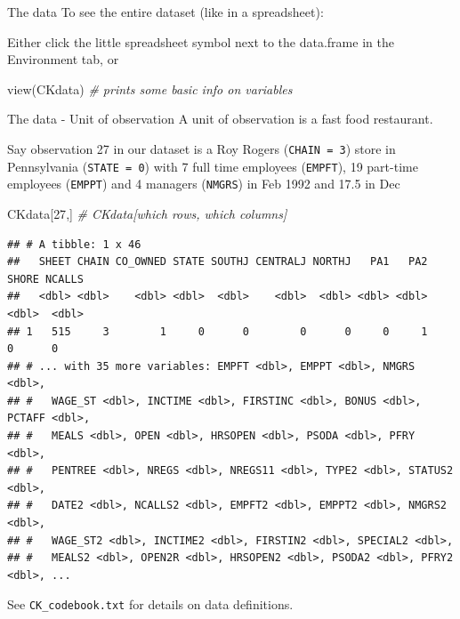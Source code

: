 \documentclass[
  ignorenonframetext,
]{beamer}
\newenvironment{Shaded}{\begin{snugshade}}{\end{snugshade}}
\newcommand{\CommentTok}[1]{\textcolor[rgb]{0.56,0.35,0.01}{\textit{#1}}}
\newcommand{\DecValTok}[1]{\textcolor[rgb]{0.00,0.00,0.81}{#1}}
\newcommand{\FunctionTok}[1]{\textcolor[rgb]{0.00,0.00,0.00}{#1}}
\newcommand{\NormalTok}[1]{#1}
\begin{document}
\begin{frame}[fragile]{The data}
\protect\hypertarget{the-data-1}{}
To see the entire dataset (like in a spreadsheet):

Either click the little spreadsheet symbol next to the data.frame in the
Environment tab, or

\begin{Shaded}
\begin{Highlighting}[]
\FunctionTok{view}\NormalTok{(CKdata)  }\CommentTok{\# prints some basic info on variables}
\end{Highlighting}
\end{Shaded}
\end{frame}

\begin{frame}[fragile]{The data - Unit of observation}
\protect\hypertarget{the-data---unit-of-observation}{}
A unit of observation is a fast food restaurant.

Say observation 27 in our dataset is a Roy Rogers (\texttt{CHAIN = 3})
store in Pennsylvania (\texttt{STATE = 0}) with 7 full time employees
(\texttt{EMPFT}), 19 part-time employees (\texttt{EMPPT}) and 4 managers
(\texttt{NMGRS}) in Feb 1992 and 17.5 in Dec

\begin{Shaded}
\begin{Highlighting}[]
\NormalTok{CKdata[}\DecValTok{27}\NormalTok{,]  }\CommentTok{\# CKdata[which rows, which columns]}
\end{Highlighting}
\end{Shaded}

\begin{verbatim}
## # A tibble: 1 x 46
##   SHEET CHAIN CO_OWNED STATE SOUTHJ CENTRALJ NORTHJ   PA1   PA2 SHORE NCALLS
##   <dbl> <dbl>    <dbl> <dbl>  <dbl>    <dbl>  <dbl> <dbl> <dbl> <dbl>  <dbl>
## 1   515     3        1     0      0        0      0     0     1     0      0
## # ... with 35 more variables: EMPFT <dbl>, EMPPT <dbl>, NMGRS <dbl>,
## #   WAGE_ST <dbl>, INCTIME <dbl>, FIRSTINC <dbl>, BONUS <dbl>, PCTAFF <dbl>,
## #   MEALS <dbl>, OPEN <dbl>, HRSOPEN <dbl>, PSODA <dbl>, PFRY <dbl>,
## #   PENTREE <dbl>, NREGS <dbl>, NREGS11 <dbl>, TYPE2 <dbl>, STATUS2 <dbl>,
## #   DATE2 <dbl>, NCALLS2 <dbl>, EMPFT2 <dbl>, EMPPT2 <dbl>, NMGRS2 <dbl>,
## #   WAGE_ST2 <dbl>, INCTIME2 <dbl>, FIRSTIN2 <dbl>, SPECIAL2 <dbl>,
## #   MEALS2 <dbl>, OPEN2R <dbl>, HRSOPEN2 <dbl>, PSODA2 <dbl>, PFRY2 <dbl>, ...
\end{verbatim}

See \texttt{CK\_codebook.txt} for details on data definitions.
\end{frame}
\end{document}
